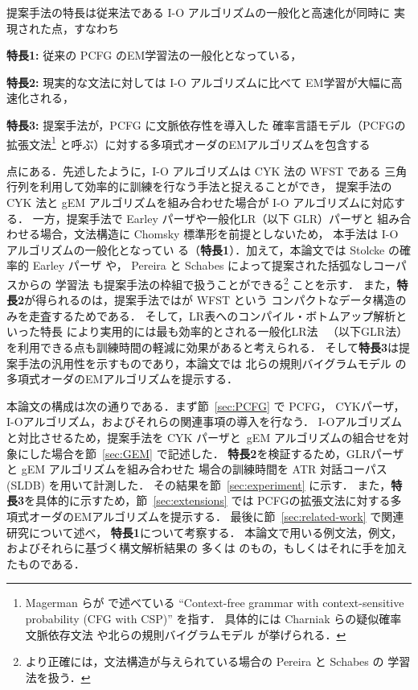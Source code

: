 {提案手法の特長は従来法である I-O アルゴリズムの一般化と高速化が同時に
実現された点，すなわち
\begin{description}
\item{\bf 特長1:} 従来の PCFG のEM学習法の一般化となっている，
\item{\bf 特長2:} 現実的な文法に対しては I-O アルゴリズムに比べて
	EM学習が大幅に高速化される，
\item{\bf 特長3:} 提案手法が，PCFG に文脈依存性を導入した
	確率言語モデル（PCFGの拡張文法\footnote{
	Magerman らが \cite{Magerman92} で述べている ``Context-free grammar
	with context-sensitive probability (CFG with CSP)'' を指す．
	具体的には Charniak らの疑似確率文脈依存文法 \cite{Charniak94b}
	や北らの規則バイグラムモデル \cite{Kita94} が挙げられる．
	}
	と呼ぶ）に対する多項式オーダのEMアルゴリズムを包含する
\end{description}
点にある．先述したように，I-O アルゴリズムは CYK 法の WFST である
三角行列を利用して効率的に訓練を行なう手法と捉えることができ，
提案手法の CYK 法と gEM アルゴリズムを組み合わせた場合が I-O
アルゴリズムに対応する．
一方，提案手法で Earley パーザや一般化LR（以下 GLR）パーザと
組み合わせる場合，文法構造に Chomsky 標準形を前提としないため，
本手法は I-O アルゴリズムの一般化となってい
る（{\bf 特長1}）．加えて，本論文では Stolcke の確率的 Earley パーザ
\cite{Stolcke95} や，
Pereira と Schabes によって提案された括弧なしコーパスからの
学習法 \cite{Pereira92} も提案手法の枠組で扱うことができる\footnote{
より正確には，文法構造が与えられている場合の Pereira と Schabes の
学習法を扱う．
}
ことを示す．
また，{\bf 特長2}が得られるのは，提案手法ではが WFST という
コンパクトなデータ構造のみを走査するためである．
そして，LR表へのコンパイル・ボトムアップ解析といった特長
により実用的には最も効率的とされる一般化LR法~\cite{Tomita91}
（以下GLR法）を利用できる点も訓練時間の軽減に効果があると考えられる．
そして{\bf 特長3}は提案手法の汎用性を示すものであり，本論文では
北らの規則バイグラムモデル \cite{Kita94} の
多項式オーダのEMアルゴリズムを提示する．

本論文の構成は次の通りである．まず節~\ref{sec:PCFG} で PCFG，
CYKパーザ，I-Oアルゴリズム，およびそれらの関連事項の導入を行なう．
I-Oアルゴリズムと対比させるため，提案手法を CYK パーザと\
gEM アルゴリズムの組合せを対象にした場合を節~\ref{sec:GEM} で記述した．
{\bf 特長2}を検証するため，GLRパーザと gEM アルゴリズムを組み合わせた
場合の訓練時間を ATR 対話コーパス (SLDB) を用いて計測した．
その結果を節~\ref{sec:experiment} に示す．
また，{\bf 特長3}を具体的に示すため，節~\ref{sec:extensions} では
PCFGの拡張文法に対する多項式オーダのEMアルゴリズムを提示する．
最後に節~\ref{sec:related-work} で関連研究について述べ，
{\bf 特長1}について考察する．
本論文で用いる例文法，例文，およびそれらに基づく構文解析結果の
多くは \cite{Nagata99} のもの，もしくはそれに手を加えたものである．

}
